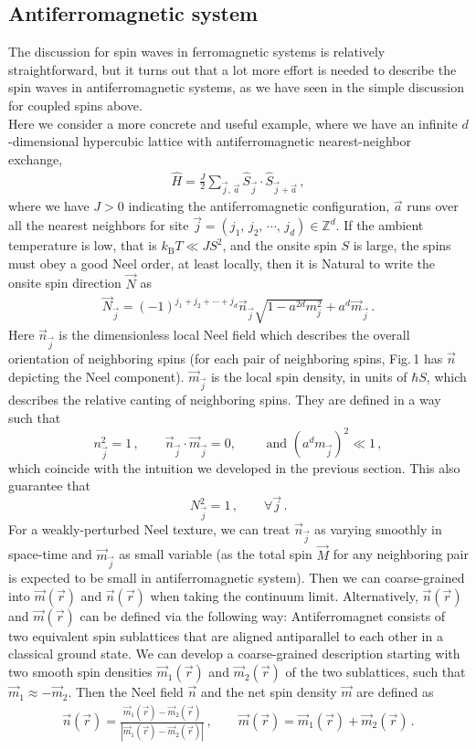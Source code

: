 \documentclass[11pt, onesided]{book}
\theoremstyle{break}
\theoremstyle{break}
\newcommand{\Z}{\mathbb{Z}}
\begin{document}
\subsection{Antiferromagnetic system}
The discussion for spin waves in ferromagnetic systems is relatively straightforward, but it turns out that a lot more effort is needed to describe the spin waves in antiferromagnetic systems, as we have seen in the simple discussion for coupled spins above. \\

Here we consider a more concrete and useful example, where we have an infinite $d$-dimensional hypercubic lattice with antiferromagnetic nearest-neighbor exchange,
\begin{align*}
\hat{H} = \frac{J}{2}\sum_{\vec{j},\, \vec{a}} \hat{S}_{\vec{j}}\cdot \hat{S}_{\vec{j}+\vec{a}}\,,
\end{align*}
where we have $J>0$ indicating the antiferromagnetic configuration, $\vec{a}$ runs over all the nearest neighbors for site $\vec{j} = (j_1,\,j_2,\,\cdots,\,j_d) \in \Z^d$. If the ambient temperature is low, that is $k_\text{B}T \ll JS^2$, and the onsite spin $S$ is large, the spins must obey a good Neel order, at least locally, then it is Natural to write the onsite spin direction $\vec{N}$ as 
\begin{align*}
\vec{N}_{\vec{j}} = (-1)^{j_1 + j_2 + \cdots + j_d} \vec{n}_{\vec{j}}\sqrt{1 - a^{2d} m_j^2} + a^d\vec{m}_{\vec{j}}\,.
\end{align*}
Here $\vec{n}_{\vec{j}}$ is the dimensionless local Neel field which describes the overall orientation of neighboring spins (for each pair of neighboring spins, Fig.\,1 has $\vec{n}$ depicting the Neel component). $\vec{m}_{\vec{j}}$ is the local spin density, in units of $\hbar S$, which describes the relative canting of neighboring spins. They are defined in a way such that $$n_{\vec{j}}^2 = 1\,,\qquad \vec{n}_{\vec{j}}\cdot \vec{m}_{\vec{j}} = 0, \qquad\text{ and }(a^dm_{\vec{j}})^2 \ll 1\,,$$ which coincide with the intuition we developed in the previous section. This also guarantee that $$N_{\vec{j}}^2 = 1\,,\qquad \forall\vec{j}\,.$$ For a weakly-perturbed Neel texture, we can treat $\vec{n}_{\vec{j}}$ as varying smoothly in space-time and $\vec{m}_{\vec{j}}$ as small variable (as the total spin $\vec{M}$ for any neighboring pair is expected to be small in antiferromagnetic system). Then we can coarse-grained into $\vec{m}(\vec{r})$ and $\vec{n}(\vec{r})$ when taking the continuum limit. Alternatively, $\vec{n}(\vec{r})$ and $\vec{m}(\vec{r})$ can be defined via the following way: Antiferromagnet consists of two equivalent spin sublattices that are aligned antiparallel to each other in a classical ground state. We can develop a coarse-grained description starting with two smooth spin densities $\vec{m}_1(\vec{r})$ and $\vec{m}_2(\vec{r})$ of the two sublattices, such that $\vec{m}_1 \approx - \vec{m}_2$. Then the Neel field $\vec{n}$ and the net spin density $\vec{m}$ are defined as 
\begin{align*}
\vec{n}(\vec{r}) = \frac{\vec{m}_1(\vec{r}) - \vec{m}_2(\vec{r})}{|\vec{m}_1(\vec{r}) - \vec{m}_2(\vec{r})|}\,,\qquad
\vec{m}(\vec{r}) = \vec{m}_1(\vec{r}) + \vec{m}_2(\vec{r})\,.
\end{align*}
\end{document}
